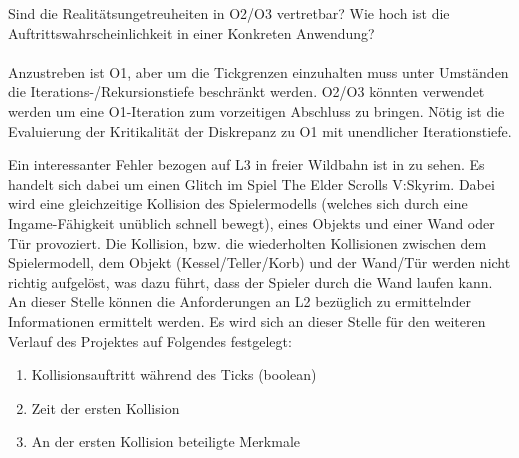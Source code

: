Sind die Realitätsungetreuheiten in O2/O3 vertretbar? Wie hoch ist die Auftrittswahrscheinlichkeit in einer Konkreten Anwendung?\\
\\
Anzustreben ist O1, aber um die Tickgrenzen einzuhalten muss unter Umständen die Iterations-/Rekursionstiefe beschränkt werden. O2/O3 könnten verwendet werden um eine O1-Iteration zum vorzeitigen Abschluss zu bringen. Nötig ist die Evaluierung der Kritikalität der Diskrepanz zu O1 mit unendlicher Iterationstiefe.
 
Ein interessanter Fehler bezogen auf L3 in freier Wildbahn ist in \cite{skyrimwallglitch} zu sehen. Es handelt sich dabei um einen Glitch im Spiel The Elder Scrolls V:Skyrim. Dabei wird eine gleichzeitige Kollision des Spielermodells (welches sich durch eine Ingame-Fähigkeit unüblich schnell bewegt), eines Objekts und einer Wand oder Tür provoziert. Die Kollision, bzw. die wiederholten Kollisionen zwischen dem Spielermodell, dem Objekt (Kessel/Teller/Korb) und der Wand/Tür werden nicht richtig aufgelöst, was dazu führt, dass der Spieler durch die Wand laufen kann.\\

An dieser Stelle können die Anforderungen an L2 bezüglich zu ermittelnder Informationen ermittelt werden. Es wird sich an dieser Stelle für den weiteren Verlauf des Projektes auf Folgendes festgelegt:
\begin{enumerate}
	\item Kollisionsauftritt während des Ticks (boolean)
	\item Zeit der ersten Kollision
	\item An der ersten Kollision beteiligte Merkmale
\end{enumerate}


